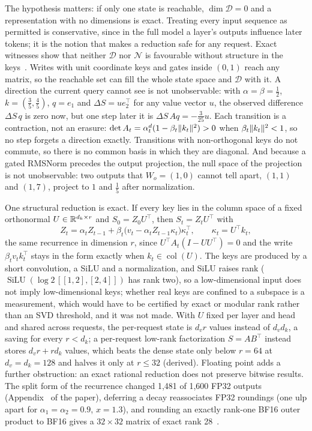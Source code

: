 The hypothesis matters: if only one state is reachable, $\dim\mathcal D=0$ and a representation with no dimensions is exact. Treating every input sequence as permitted is conservative, since in the full model a layer's outputs influence later tokens; it is the notion that makes a reduction safe for any request. Exact witnesses show that neither $\mathcal D$ nor $\mathcal N$ is favourable without structure in the keys~. Writes with unit coordinate keys and gates inside $(0,1)$ reach any matrix, so the reachable set can fill the whole state space and $\mathcal D$ with it. A direction the current query cannot see is not unobservable: with $\alpha=\beta=\tfrac12$, $k=(\tfrac35,\tfrac45)$, $q=e_1$ and $\Delta S=ue_2^\top$ for any value vector $u$, the observed difference $\Delta S\,q$ is zero now, but one step later it is $\Delta S\,Aq=-\tfrac{3}{25}u$. Each transition is a contraction, not an erasure: $\det A_t=\alpha_t^d(1-\beta_t\lVert k_t\rVert^2)>0$ when $\beta_t\lVert k_t\rVert^2<1$, so no step forgets a direction exactly. Transitions with non-orthogonal keys do not commute, so there is no common basis in which they are diagonal. And because a gated RMSNorm precedes the output projection, the null space of the projection is not unobservable: two outputs that $W_o=(1,0)$ cannot tell apart, $(1,1)$ and $(1,7)$, project to $1$ and $\tfrac15$ after normalization.

One structural reduction is exact. If every key lies in the column space of a fixed orthonormal $U\in\mathbb R^{d_k\times r}$ and $S_0=Z_0U^\top$, then $S_t=Z_tU^\top$ with
\[Z_t=\alpha_tZ_{t-1}+\beta_t\bigl(v_t-\alpha_tZ_{t-1}\kappa_t\bigr)\kappa_t^\top,\qquad\kappa_t=U^\top k_t,\]
the same recurrence in dimension $r$, since $U^\top A_t(I-UU^\top)=0$ and the write $\beta_tv_tk_t^\top$ stays in the form exactly when $k_t\in\operatorname{col}(U)$. The keys are produced by a short convolution, a SiLU and a normalization, and SiLU raises rank ($\operatorname{SiLU}(\log2\,[[1,2],[2,4]])$ has rank two), so a low-dimensional input does not imply low-dimensional keys; whether real keys are confined to a subspace is a measurement, which would have to be certified by exact or modular rank rather than an SVD threshold, and it was not made. With $U$ fixed per layer and head and shared across requests, the per-request state is $d_vr$ values instead of $d_vd_k$, a saving for every $r<d_k$; a per-request low-rank factorization $S=AB^\top$ instead stores $d_vr+rd_k$ values, which beats the dense state only below $r=64$ at $d_v=d_k=128$ and halves it only at $r\le32$ (derived). Floating point adds a further obstruction: an exact rational reduction does not preserve bitwise results. The split form of the recurrence changed 1,481 of 1,600 FP32 outputs (Appendix~ of the paper), deferring a decay reassociates FP32 roundings (one ulp apart for $\alpha_1=\alpha_2=0.9$, $x=1.3$), and rounding an exactly rank-one BF16 outer product to BF16 gives a $32\times32$ matrix of exact rank 28~.

